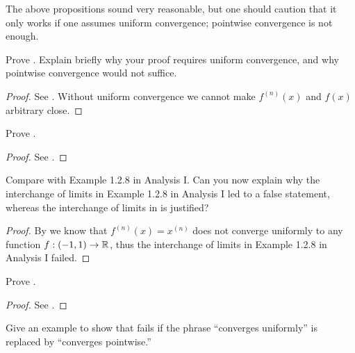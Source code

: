 \begin{rmk}\label{ii:3.3.7}
  The above propositions sound very reasonable, but one should caution that it only works if one assumes uniform convergence;
  pointwise convergence is not enough.
\end{rmk}

\exercisesection

\begin{ex}\label{ii:ex:3.3.1}
  Prove .
  Explain briefly why your proof requires uniform convergence, and why pointwise convergence would not suffice.
\end{ex}

\begin{proof}
  See .
  Without uniform convergence we cannot make \(f^{(n)}(x)\) and \(f(x)\) arbitrary close.
\end{proof}

\begin{ex}\label{ii:ex:3.3.2}
  Prove .
\end{ex}

\begin{proof}
  See .
\end{proof}

\begin{ex}\label{ii:ex:3.3.3}
  Compare  with Example 1.2.8 in Analysis I.
  Can you now explain why the interchange of limits in Example 1.2.8 in Analysis I led to a false statement, whereas the interchange of limits in  is justified?
\end{ex}

\begin{proof}
  By  we know that \(f^{(n)}(x) = x^{(n)}\) does not converge uniformly to any function \(f : (-1, 1) \to \mathbb{R}\), thus the interchange of limits in Example 1.2.8 in Analysis I failed.
\end{proof}

\begin{ex}\label{ii:ex:3.3.4}
  Prove .
\end{ex}

\begin{proof}
  See .
\end{proof}

\begin{ex}\label{ii:ex:3.3.5}
  Give an example to show that  fails if the phrase ``converges uniformly'' is replaced by ``converges pointwise.''
\end{ex}

